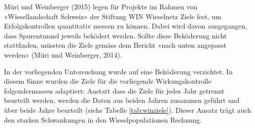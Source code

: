 \documentclass[
]{scrbook}
\begin{document}
Müri und Weinberger (2015) legen für Projekte im Rahmen von «Wiesellandschaft Schweiz» der Stiftung WIN Wieselnetz Ziele fest, um Erfolgskontrollen quantitativ messen zu können. Dabei wird davon ausgegangen, dass Spurentunnel jeweils beködert werden. Sollte diese Beköderung nicht stattfinden, müssten die Ziele gemäss dem Bericht «nach unten angepasst werden» (Müri und Weinberger, 2014).

In der vorliegenden Untersuchung wurde auf eine Beköderung verzichtet. In diesem Sinne wurden die Ziele für die vorliegende Wirkungskontrolle folgendermassen adaptiert: Anstatt dass die Ziele für jedes Jahr getrennt beurteilt werden, werden die Daten aus beiden Jahren zusammen geführt und über beide Jahre beurteilt (siehe Tabelle \ref{tab:winziele}). Dieser Ansatz trägt auch den starken Schwankungen in den Wieselpopulationen Rechnung.
\end{document}
